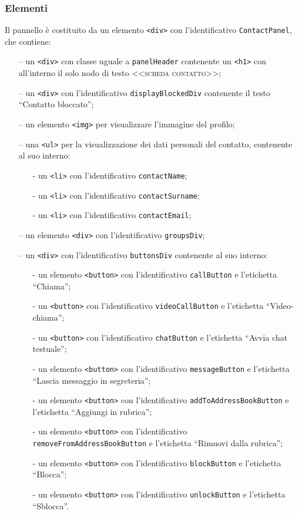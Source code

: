 \subsubsection*{Elementi}
Il pannello è costituito da un elemento \verb'<div>' con l'identificativo \verb'ContactPanel', che contiene:
\begin{itemize}
  \item[--] un \verb'<div>' con classe uguale a \verb'panelHeader' contenente un \verb'<h1>' con all'interno il solo nodo di testo \textsc{<<scheda contatto>>};
  \item[--] un \verb'<div>' con l'identificativo \verb'displayBlockedDiv' contenente il testo ``Contatto bloccato'';
  \item[--] un elemento \verb'<img>' per visualizzare l'immagine del profilo;
  \item[--] una \verb'<ul>' per la  visualizzazione dei dati personali del contatto, contenente al suo interno:
  \begin{itemize}
    \item[-] un \verb'<li>' con l'identificativo \verb'contactName';
    \item[-] un \verb'<li>' con l'identificativo \verb'contactSurname';
    \item[-] un \verb'<li>' con l'identificativo \verb'contactEmail';
  \end{itemize}
  \item[--] un elemento \verb'<div>' con l'identificativo \verb'groupsDiv';
  \item[--] un \verb'<div>' con l'identificativo \verb'buttonsDiv' contenente al suo interno:
  \begin{itemize}
    \item[-] un elemento \verb'<button>' con l'identificativo \verb'callButton' e l'etichetta ``Chiama'';
    \item[-] un \verb'<button>' con l'identificativo \verb'videoCallButton' e l'etichetta ``Video-chiama'';
    \item[-] un \verb'<button>' con l'identificativo \verb'chatButton' e l'etichetta ``Avvia chat testuale'';
    \item[-] un elemento \verb'<button>' con l'identificativo \verb'messageButton' e l'etichetta ``Lascia messaggio in segreteria'';
    \item[-] un elemento \verb'<button>' con l'identificativo \verb'addToAddressBookButton' e l'etichetta ``Aggiungi in rubrica'';
    \item[-] un elemento \verb'<button>' con l'identificativo \verb'removeFromAddressBookButton' e l'etichetta ``Rimuovi dalla rubrica'';
    \item[-] un elemento \verb'<button>' con l'identificativo \verb'blockButton' e l'etichetta ``Blocca'';
    \item[-] un elemento \verb'<button>' con l'identificativo \verb'unlockButton' e l'etichetta ``Sblocca''.
  \end{itemize}
\end{itemize}


